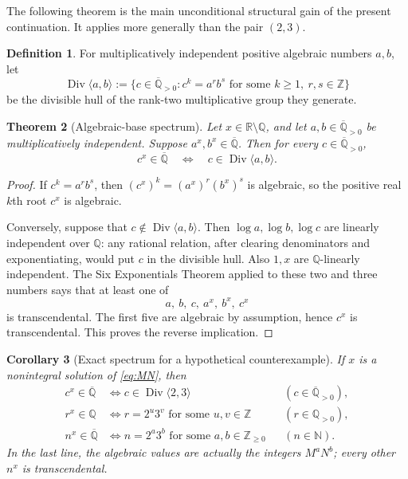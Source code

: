 \documentclass[11pt]{article}
\numberwithin{equation}{section}
\newtheorem{theorem}{Theorem}[section]
\newtheorem{corollary}[theorem]{Corollary}
\theoremstyle{definition}
\newtheorem{definition}[theorem]{Definition}
\theoremstyle{remark}
\newcommand{\Q}{\mathbb{Q}}
\newcommand{\Z}{\mathbb{Z}}
\newcommand{\N}{\mathbb{N}}
\newcommand{\R}{\mathbb{R}}
\newcommand{\Qbar}{\overline{\mathbb{Q}}}
\newcommand{\Div}{\operatorname{Div}}
\begin{document}
The following theorem is the main unconditional structural gain of the present continuation.  It applies more generally than the pair $(2,3)$.

\begin{definition}
For multiplicatively independent positive algebraic numbers $a,b$, let
\[
 \Div\langle a,b\rangle
 :=\{c\in\Qbar_{>0}: c^k=a^r b^s\text{ for some }k\ge1,\ r,s\in\Z\}
\]
be the divisible hull of the rank-two multiplicative group they generate.
\end{definition}

\begin{theorem}[Algebraic-base spectrum]
\label{thm:spectrum}
Let $x\in\R\setminus\Q$, and let $a,b\in\Qbar_{>0}$ be multiplicatively independent.  Suppose $a^x,b^x\in\Qbar$.  Then for every $c\in\Qbar_{>0}$,
\begin{equation}
 c^x\in\Qbar
 \quad\Longleftrightarrow\quad
 c\in\Div\langle a,b\rangle.
 \label{eq:spectrum}
\end{equation}
\end{theorem}

\begin{proof}
If $c^k=a^r b^s$, then $(c^x)^k=(a^x)^r(b^x)^s$ is algebraic, so the positive real $k$th root $c^x$ is algebraic.

Conversely, suppose that $c\notin\Div\langle a,b\rangle$.  Then $\log a,\log b,\log c$ are linearly independent over $\Q$: any rational relation, after clearing denominators and exponentiating, would put $c$ in the divisible hull.  Also $1,x$ are $\Q$-linearly independent.  The Six Exponentials Theorem applied to these two and three numbers says that at least one of
\[
 a,\ b,\ c,\ a^x,\ b^x,\ c^x
\]
is transcendental.  The first five are algebraic by assumption, hence $c^x$ is transcendental.  This proves the reverse implication.
\end{proof}

\begin{corollary}[Exact spectrum for a hypothetical counterexample]
\label{cor:integer-spectrum}
If $x$ is a nonintegral solution of \eqref{eq:MN}, then
\begin{align}
 c^x\in\Qbar
 &\Longleftrightarrow c\in\Div\langle2,3\rangle
 &&(c\in\Qbar_{>0}),\label{eq:alg-spectrum-23}\\
 r^x\in\Q
 &\Longleftrightarrow r=2^u3^v\text{ for some }u,v\in\Z
 &&(r\in\Q_{>0}),\label{eq:rat-spectrum-23}\\
 n^x\in\Qbar
 &\Longleftrightarrow n=2^a3^b\text{ for some }a,b\in\Z_{\ge0}
 &&(n\in\N).\label{eq:int-spectrum-23}
\end{align}
In the last line, the algebraic values are actually the integers $M^aN^b$; every other $n^x$ is transcendental.
\end{corollary}
\end{document}
